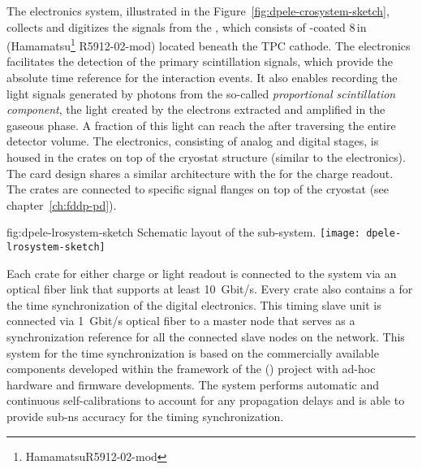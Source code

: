The  electronics system, illustrated in the Figure~\ref{fig:dpele-crosystem-sketch},  collects and digitizes the signals from the , which consists of -coated \num{8}\,in  (Hamamatsu\footnote{Hamamatsu\texttrademark R5912-02-mod} R5912-02-mod) located beneath the TPC cathode. The  electronics %
facilitates the detection of the primary scintillation signals, which provide the absolute time reference for the interaction events. It %
also enables recording the light signals generated by photons from the so-called \textit{proportional scintillation component}, the light created by the electrons extracted and amplified in the gaseous phase. A fraction of this light can reach the  after traversing the entire detector volume.  
The  electronics, consisting of analog and digital stages, is housed in the  crates on top of the cryostat structure (similar to the  electronics). The   card design shares a similar architecture with the  for the charge readout. The   crates are connected to specific  signal \fdth flanges on top of the cryostat (see chapter~\ref{ch:fddp-pd}).

\begin{dunefigure}{fig:dpele-lrosystem-sketch}
{Schematic layout of the   sub-system.}
\texttt{[image: dpele-lrosystem-sketch]}
\end{dunefigure}

Each  crate for either charge or light readout is connected to the  system via an optical fiber link that supports at least \SI{10}{Gbit/s}. 
Every crate also contains a %
 for the time synchronization of the digital electronics. This timing slave unit is connected via \SI{1}{Gbit/s} optical fiber to a master node that serves as a synchronization reference for all the connected slave nodes on the network. This system for the time synchronization is based on the commercially available components developed within the framework of the () project with ad-hoc hardware and firmware developments. The system performs automatic and continuous self-calibrations to account for any propagation delays and is able to provide sub-\si{\nano\s} accuracy for the timing synchronization.


